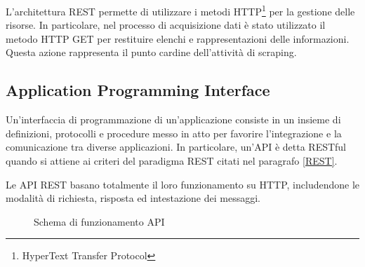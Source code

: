 L'architettura REST permette di utilizzare i metodi HTTP\footnote{HyperText Transfer Protocol} per la gestione delle risorse.\cite{fielding2000architectural}
In particolare, nel processo di acquisizione dati \`e stato utilizzato il metodo HTTP GET per restituire elenchi e rappresentazioni delle informazioni. Questa azione rappresenta il punto cardine dell'attivit\`a di scraping.


\subsection{Application Programming Interface} \label{API}
Un'interfaccia di programmazione di un'applicazione consiste in un insieme di definizioni, protocolli e procedure messo in atto per favorire l'integrazione e la comunicazione tra diverse applicazioni.
In particolare, un'API \`e detta RESTful quando si attiene ai criteri del paradigma REST citati nel paragrafo \ref{REST}.

Le API REST basano totalmente il loro funzionamento su HTTP, includendone le modalit\`a di richiesta, risposta ed intestazione dei messaggi.\cite{masse2011rest}
\begin{figure}[!htb]
  \begin{center}
  
  \caption{Schema di funzionamento API}
\end{center}
\end{figure}


